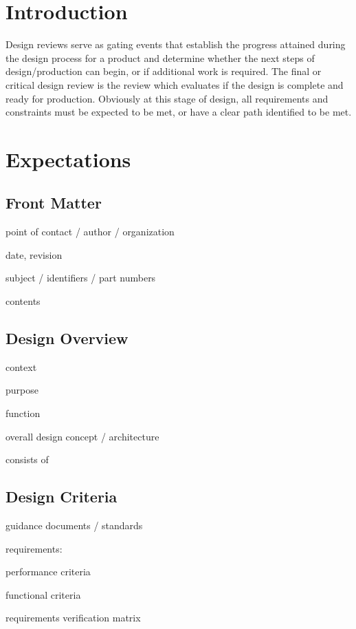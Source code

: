 \documentclass[12pt]{article}
\begin{document}
\newpage

\section{Introduction}
Design reviews serve as gating events that establish the progress attained during the design process for a product and determine whether the next steps of design/production can begin, or if additional work is required.
The final or critical design review is the review which evaluates if the design is complete and ready for production.
Obviously at this stage of design, all requirements and constraints must be expected to be met, or have a clear path identified to be met.

\section{Expectations}

\subsection{Front Matter}

point of contact / author / organization

date, revision 

subject / identifiers / part numbers

contents


\subsection{Design Overview}

context

purpose 

function

overall design concept / architecture

consists of


\subsection{Design Criteria}

guidance documents / standards

requirements:

performance criteria

functional criteria

requirements verification matrix
\end{document}
